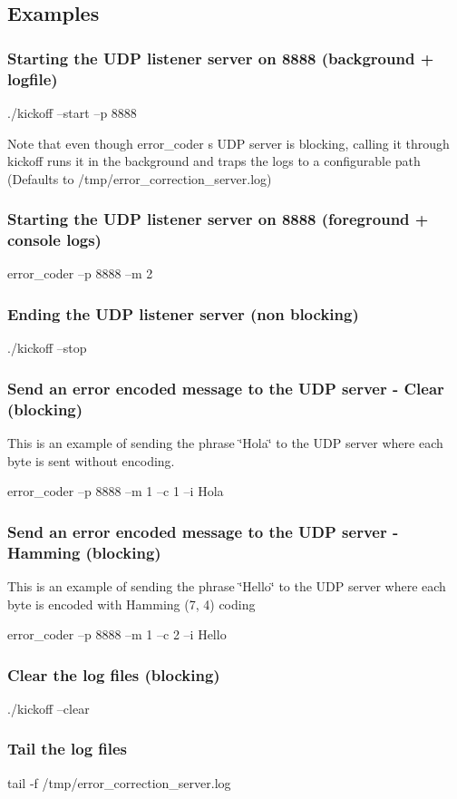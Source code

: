 \subsection*{Examples}

\subsubsection*{Starting the U\+DP listener server on 8888 (background + logfile)}

./kickoff --start --p 8888

Note that even though error\+\_\+coder \textquotesingle{}s U\+DP server is blocking, calling it through kickoff runs it in the background and traps the logs to a configurable path (Defaults to /tmp/error\+\_\+correction\+\_\+server.log)

\subsubsection*{Starting the U\+DP listener server on 8888 (foreground + console logs)}

error\+\_\+coder --p 8888 --m 2

\subsubsection*{Ending the U\+DP listener server (non blocking)}

./kickoff --stop

\subsubsection*{Send an error encoded message to the U\+DP server -\/ Clear (blocking)}

This is an example of sending the phrase \char`\"{}\+Hola\char`\"{} to the U\+DP server where each byte is sent without encoding.

error\+\_\+coder --p 8888 --m 1 --c 1 --i Hola

\subsubsection*{Send an error encoded message to the U\+DP server -\/ Hamming (blocking)}

This is an example of sending the phrase \char`\"{}\+Hello\char`\"{} to the U\+DP server where each byte is encoded with Hamming (7, 4) coding

error\+\_\+coder --p 8888 --m 1 --c 2 --i Hello

\subsubsection*{Clear the log files (blocking)}

./kickoff --clear

\subsubsection*{Tail the log files}

tail -\/f /tmp/error\+\_\+correction\+\_\+server.log 